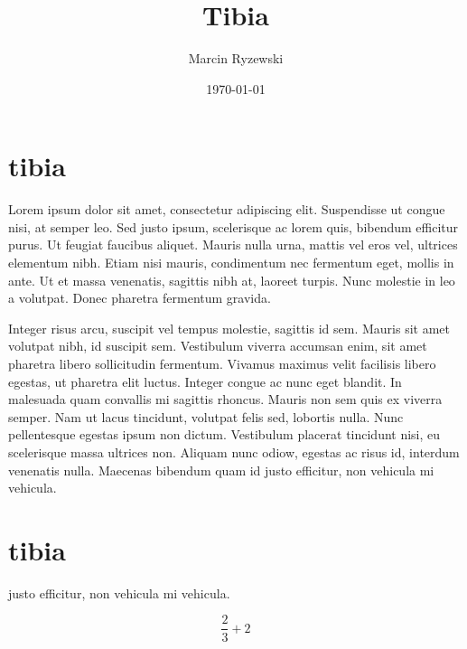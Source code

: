 \documentclass{article}
\begin{document}
\title{Tibia}
\author{Marcin Ryzewski}
\date{\today}
\maketitle  

\section{tibia}

Lorem ipsum dolor sit amet, consectetur adipiscing elit. 
Suspendisse ut congue nisi, at semper leo. Sed justo ipsum, 
scelerisque ac lorem quis, bibendum efficitur purus. 
Ut feugiat faucibus aliquet. Mauris nulla urna, mattis vel 
eros vel, ultrices elementum nibh. Etiam nisi mauris, 
condimentum nec fermentum eget, mollis in ante. Ut et 
massa venenatis, sagittis nibh at, laoreet turpis. Nunc molestie 
in leo a volutpat. Donec pharetra fermentum gravida.

Integer risus arcu, suscipit vel tempus molestie, 
sagittis id sem. Mauris sit amet volutpat nibh, id suscipit sem. 
Vestibulum viverra accumsan enim, sit amet pharetra libero 
sollicitudin fermentum. Vivamus maximus velit facilisis libero 
egestas, ut pharetra elit luctus. Integer congue ac nunc eget 
blandit. In malesuada quam convallis mi sagittis rhoncus. Mauris non 
sem quis ex viverra semper. Nam ut lacus tincidunt, volutpat felis sed, 
lobortis nulla. Nunc pellentesque egestas ipsum non dictum. Vestibulum 
placerat tincidunt nisi, eu scelerisque massa ultrices non. Aliquam nunc odiow,
egestas ac risus id, interdum venenatis nulla. Maecenas bibendum quam id 
justo efficitur, non vehicula mi vehicula.

\section{tibia}
justo efficitur,  non vehicula mi vehicula. 

\begin{equation}
    \frac{2}{3} + 2
\end{equation}
\end{document}
